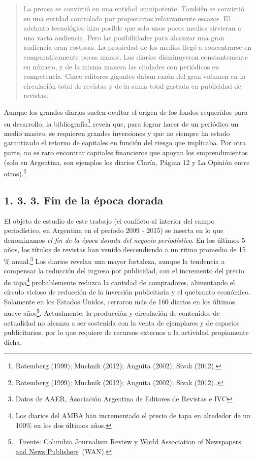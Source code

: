 {\begin{quote}
La prensa se convirtió en una entidad omnipotente. También se convirtió en una entidad controlada por propietarios relativamente escasos. El adelanto tecnológico hizo posible que solo unos pocos medios sirvieran a una vasta audiencia. Pero las posibilidades para alcanzar una gran audiencia eran costosas. La propiedad de los medios llegó a concentrarse en comparativamente pocas manos. Los diarios disminuyeron constantemente en número, y de la misma manera las ciudades con periódicos en competencia. Cinco editores gigantes daban razón del gran volumen en la circulación total de revistas y de la suma total gastada en publicidad de revistas.
\end{quote}

Aunque los grandes diarios suelen ocultar el origen de los fondos requeridos para su desarrollo, la bibliografía\footnote{Rotemberg (1999); Muchnik (2012); Anguita (2002); Sivak (2012).} revela que, para lograr hacer de un periódico un medio masivo, se requieren grandes inversiones y que no siempre ha estado garantizado el retorno de capitales en función del riesgo que implicaba. Por otra parte, no es raro encontrar capitales financieros que apoyan los emprendimientos (solo en Argentina, son ejemplos los diarios Clarín, Página 12 y La Opinión entre otros).\footnote{Rotemberg (1999); Muchnik (2012); Anguita (2002); Sivak (2012)..}

\subsection{1. 3. 3. Fin de la época dorada}

El objeto de estudio de este trabajo (el conflicto al interior del campo periodístico, en Argentina en el período 2009 - 2015) se inserta en lo que denominamos \emph{el fin de la época dorada del negocio periodístico}. En los últimos 5 años, los títulos de revistas han venido descendiendo a un ritmo promedio de 15 \% anual.\footnote{Datos de AAER, Asociación Argentina de Editores de Revistas e IVC} Los diarios revelan una mayor fortaleza, aunque la tendencia a compensar la reducción del ingreso por publicidad, con el incremento del precio de tapa\footnote{Los diarios del AMBA han incrementado el precio de tapa en alrededor de un 100\% en los dos últimos años.} probablemente reduzca la cantidad de compradores, alimentando el círculo vicioso de reducción de la inversión publicitaria y el quebranto económico. Solamente en los Estados Unidos, cerraron más de 160 diarios en los últimos nueve años\footnote{~Fuente: Columbia Journalism Review y \href{http://www.wan-ifra.org/}{World Association of Newspapers and News Publishers}~(WAN).}. Actualmente, la producción y circulación de contenidos de actualidad no alcanza a ser sostenida con la venta de ejemplares y de espacios publicitarios, por lo que requiere de recursos externos a la actividad propiamente dicha.

}
